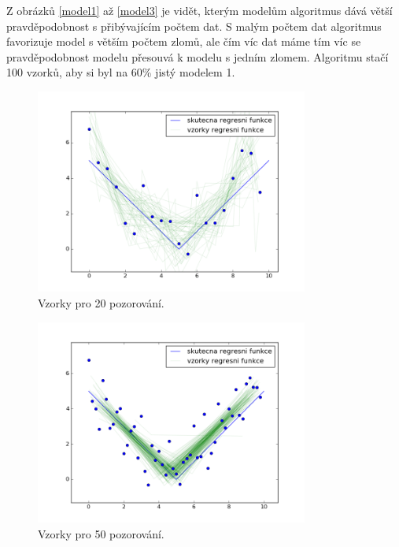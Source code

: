 \documentclass[czech,master,public,dept470,male,cpdeclaration,oneside, python]{diploma}
\begin{document}
Z obrázků \ref{model1} až \ref{model3} je vidět, kterým modelům algoritmus dává větší pravděpodobnost s přibývajícím počtem dat. S malým počtem dat algoritmus favorizuje model s větším počtem zlomů, ale čím víc dat máme tím víc se pravděpodobnost modelu přesouvá k modelu s jedním zlomem. Algoritmu stačí 100 vzorků, aby si byl na 60\% jistý modelem 1.

\begin{figure}
	[H]\centering\includegraphics[width=0.8\textwidth]{images/priklad3_20n_lines.png}\caption{Vzorky pro 20 pozorování.}\label{priklad3_lines_20}
\end{figure}

\begin{figure}
	[H]\centering\includegraphics[width=0.8\textwidth]{images/priklad3_50n_lines.png}\caption{Vzorky pro 50 pozorování.}\label{priklad3_lines_50}
\end{figure}
\end{document}
